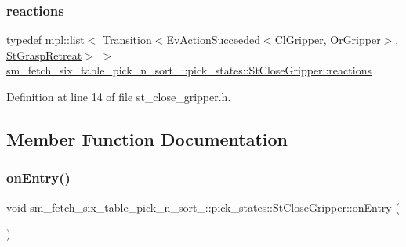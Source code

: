\subsubsection{\texorpdfstring{reactions}{reactions}}
{\footnotesize\ttfamily typedef mpl\+::list$<$ \hyperlink{classsmacc_1_1Transition}{Transition}$<$\hyperlink{structsmacc_1_1default__events_1_1EvActionSucceeded}{Ev\+Action\+Succeeded}$<$\hyperlink{classsm__fetch__six__table__pick__n__sort__1_1_1cl__gripper_1_1ClGripper}{Cl\+Gripper}, \hyperlink{classsm__fetch__six__table__pick__n__sort__1_1_1OrGripper}{Or\+Gripper}$>$, \hyperlink{structsm__fetch__six__table__pick__n__sort__1_1_1pick__states_1_1StGraspRetreat}{St\+Grasp\+Retreat}$>$ $>$ \hyperlink{structsm__fetch__six__table__pick__n__sort__1_1_1pick__states_1_1StCloseGripper_a1e740e1c51549e2efb4bd93129449231}{sm\+\_\+fetch\+\_\+six\+\_\+table\+\_\+pick\+\_\+n\+\_\+sort\+\_\+::pick\+\_\+states\+::\+St\+Close\+Gripper\+::reactions}}



Definition at line 14 of file st\+\_\+close\+\_\+gripper.\+h.



\subsection{Member Function Documentation}
\mbox{\label{structsm__fetch__six__table__pick__n__sort__1_1_1pick__states_1_1StCloseGripper_a704b4251148dc9430cc49cd3e2cdf015}} 
\subsubsection{\texorpdfstring{on\+Entry()}{onEntry()}}
{\footnotesize\ttfamily void sm\+\_\+fetch\+\_\+six\+\_\+table\+\_\+pick\+\_\+n\+\_\+sort\+\_\+::pick\+\_\+states\+::\+St\+Close\+Gripper\+::on\+Entry (\begin{DoxyParamCaption}{ }\end{DoxyParamCaption})\hspace{0.3cm}{\ttfamily [inline]}}



